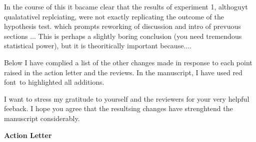 \documentclass[12pt]{article}
\begin{document}
In the course of this it bacame clear that the results of experiment 1, althoguyt qualatativel replciating, were not exactly replicating the outcome of the hypothesis test.  which prompts reworking of discussion and intro of prevuous sections ... This is perhaps a slightly boring conclusion (you need tremendous statistical power), but it is theoritically important because....

Below I have complied a list of the other changes made in response to each point raised in the action letter and the reviews. In the manuscript, I have used  \color{red}red font\color{black}~to highlighted all additions.%

I want to stress my gratitude to yourself and the reviewers for your very helpful feeback. I hope you agree that the resultsing changes have strenghtend the manuscript considerably.

\vspace{20pt}

\textbf{\large{Action Letter}}
\end{document}
